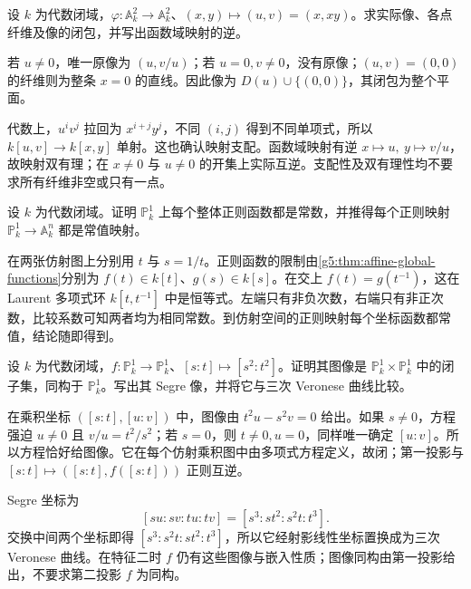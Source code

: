 \begin{exercise}\label{g5:ex:dominant-nonsurjective-plane}
	设 \(k\) 为代数闭域，\(\varphi:\mathbb A_k^2\rightarrow\mathbb A_k^2\)、\((x,y)\mapsto(u,v)=(x,xy)\)。求实际像、各点纤维及像的闭包，并写出函数域映射的逆。
\end{exercise}
\begin{solution}
	若 \(u\ne0\)，唯一原像为 \((u,v/u)\)；若 \(u=0,v\ne0\)，没有原像；\((u,v)=(0,0)\) 的纤维则为整条 \(x=0\) 的直线。因此像为 \(D(u)\cup\{(0,0)\}\)，其闭包为整个平面。

	代数上，\(u^iv^j\) 拉回为 \(x^{i+j}y^j\)，不同 \((i,j)\) 得到不同单项式，所以 \(k[u,v]\rightarrow k[x,y]\) 单射。这也确认映射支配。函数域映射有逆 \(x\mapsto u,\ y\mapsto v/u\)，故映射双有理；在 \(x\ne0\) 与 \(u\ne0\) 的开集上实际互逆。支配性及双有理性均不要求所有纤维非空或只有一点。
\end{solution}

\begin{exercise}\label{g5:ex:projective-line-global-functions}
	设 \(k\) 为代数闭域。证明 \(\mathbb P_k^1\) 上每个整体正则函数都是常数，并推得每个正则映射 \(\mathbb P_k^1\rightarrow\mathbb A_k^n\) 都是常值映射。
\end{exercise}
\begin{solution}
	在两张仿射图上分别用 \(t\) 与 \(s=1/t\)。正则函数的限制由\cref{g5:thm:affine-global-functions}分别为 \(f(t)\in k[t]\)、\(g(s)\in k[s]\)。在交上 \(f(t)=g(t^{-1})\)，这在 Laurent 多项式环 \(k[t,t^{-1}]\) 中是恒等式。左端只有非负次数，右端只有非正次数，比较系数可知两者均为相同常数。到仿射空间的正则映射每个坐标函数都常值，结论随即得到。
\end{solution}

\begin{exercise}\label{g5:ex:segre-graph-square}
	设 \(k\) 为代数闭域，\(f:\mathbb P_k^1\rightarrow\mathbb P_k^1\)、\([s:t]\mapsto[s^2:t^2]\)。证明其图像是 \(\mathbb P_k^1\times\mathbb P_k^1\) 中的闭子集，同构于 \(\mathbb P_k^1\)。写出其 Segre 像，并将它与三次 Veronese 曲线比较。
\end{exercise}
\begin{solution}
	在乘积坐标 \(([s:t],[u:v])\) 中，图像由 \(t^2u-s^2v=0\) 给出。如果 \(s\ne0\)，方程强迫 \(u\ne0\) 且 \(v/u=t^2/s^2\)；若 \(s=0\)，则 \(t\ne0,u=0\)，同样唯一确定 \([u:v]\)。所以方程恰好给图像。它在每个仿射乘积图中由多项式方程定义，故闭；第一投影与 \([s:t]\mapsto([s:t],f([s:t]))\) 正则互逆。

	Segre 坐标为
	\[
		[su:sv:tu:tv]=[s^3:st^2:s^2t:t^3].
	\]
	交换中间两个坐标即得 \([s^3:s^2t:st^2:t^3]\)，所以它经射影线性坐标置换成为三次 Veronese 曲线。在特征二时 \(f\) 仍有这些图像与嵌入性质；图像同构由第一投影给出，不要求第二投影 \(f\) 为同构。
\end{solution}

